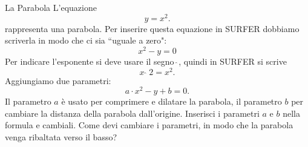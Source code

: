 \begin{surferPage}[Parabola]{La Parabola}
L'equazione  \[y=x^2.\] rappresenta una parabola.
Per inserire questa equazione in SURFER dobbiamo scriverla in modo che ci sia ``uguale a zero":
 \[x^2-y=0\]
Per indicare l'esponente si deve usare il segno $\hat{\ }$, quindi in SURFER si scrive
 \[ x  \,\hat{\ } \, 2 =x^2.\]
Aggiungiamo due parametri:
 \[a \cdot x^2-y+b=0.\]
Il parametro $a$ \`e usato per comprimere e dilatare la parabola, il parametro $b$ per cambiare la distanza della parabola dall'origine.
 \newline
 Inserisci i parametri $a$ e $b$ nella formula e cambiali. Come devi cambiare i parametri, in modo che la parabola venga ribaltata verso il basso?
 \end{surferPage}
 
 
